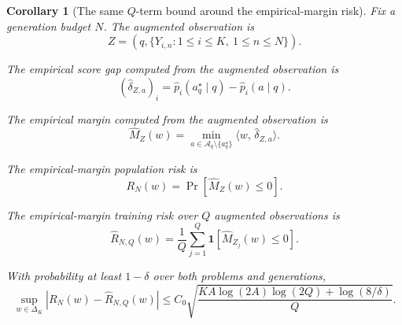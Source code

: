 \documentclass{article} %
\newtheorem{corollary}[theorem]{Corollary}
\providecommand{\Aq}{\mathcal{A}_q}
\providecommand{\simplex}{\Delta_K}
\providecommand{\Risk}{R}
\providecommand{\ip}[2]{\langle #1,\, #2\rangle}
\providecommand{\dhat}{\widehat{\delta}}
\providecommand{\phat}{\widehat{p}}
\providecommand{\Mhat}{\widehat{M}}
\begin{document}
\begin{corollary}[The same \(Q\)-term bound around the empirical-margin risk]
\label{cor:app-empirical-margin-vc}
Fix a generation budget \(N\). The augmented observation is
\begin{equation}
\label{eq:app-augmented-z}
Z
=
\left(q,\{Y_{i,n}:1\le i\le K,\ 1\le n\le N\}\right).
\end{equation}

The empirical score gap computed from the augmented observation is
\begin{equation}
\label{eq:app-dhat}
(\dhat_{Z,a})_i
=
\phat_i(a_q^\star\mid q)-\phat_i(a\mid q).
\end{equation}

The empirical margin computed from the augmented observation is
\begin{equation}
\label{eq:app-mhat-z}
\Mhat_Z(w)
=
\min_{a\in\Aq\setminus\{a_q^\star\}}
\ip{w}{\dhat_{Z,a}} .
\end{equation}

The empirical-margin population risk is
\begin{equation}
\label{eq:app-rn}
\Risk_N(w)
=
\Pr\!\left[\Mhat_Z(w)\le 0\right].
\end{equation}

The empirical-margin training risk over \(Q\) augmented observations is
\begin{equation}
\label{eq:app-rnhat}
\widehat{\Risk}_{N,Q}(w)
=
\frac1Q\sum_{j=1}^{Q}\mathbf 1\!\left[\Mhat_{Z_j}(w)\le 0\right].
\end{equation}

With probability at least \(1-\delta\) over both problems and generations,
\begin{equation}
\label{eq:app-rn-bound}
\sup_{w\in\simplex}
\left|
\Risk_N(w)-\widehat{\Risk}_{N,Q}(w)
\right|
\le
C_0
\sqrt{
\frac{
K A\log(2A)\log(2Q)+\log(8/\delta)
}{Q}
}.
\end{equation}
\end{corollary}
\end{document}
